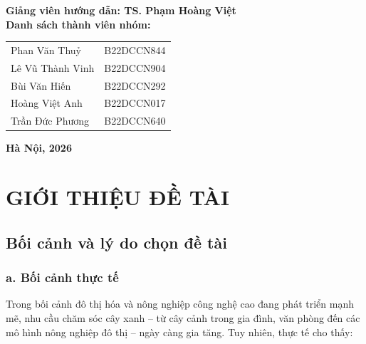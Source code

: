\documentclass[12pt,a4paper]{report}
\begin{document}
\begin{titlepage}
\begin{center}
        \textbf{Giảng viên hướng dẫn: TS. Phạm Hoàng Việt}\\[1cm]

        \textbf{Danh sách thành viên nhóm:}\\[0.5cm]
        \begin{tabular}{ll}
            Phan Văn Thuỷ   & B22DCCN844 \\
            Lê Vũ Thành Vinh & B22DCCN904 \\
            Bùi Văn Hiến     & B22DCCN292 \\
            Hoàng Việt Anh   & B22DCCN017 \\
            Trần Đức Phương  & B22DCCN640 \\
        \end{tabular}

        \vfill
        \textbf{Hà Nội, 2026}
    \end{center}
\end{titlepage}

\cleardoublepage
\tableofcontents

\cleardoublepage
\listoffigures

\cleardoublepage
{}
\setcounter{page}{1}

\chapter{GIỚI THIỆU ĐỀ TÀI}

\section{Bối cảnh và lý do chọn đề tài}

\subsection*{a. Bối cảnh thực tế}

Trong bối cảnh đô thị hóa và nông nghiệp công nghệ cao đang phát triển
mạnh mẽ, nhu cầu chăm sóc cây xanh -- từ cây cảnh trong gia đình, văn
phòng đến các mô hình nông nghiệp đô thị -- ngày càng gia tăng.
Tuy nhiên, thực tế cho thấy:
\end{document}
